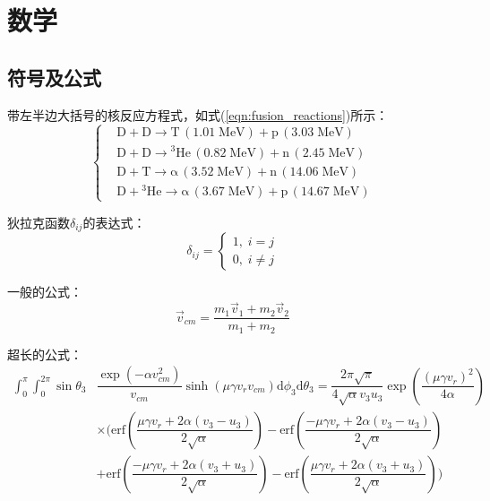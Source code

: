 \chapter{数学}
\label{cha:math}
\section{符号及公式}
\label{sec:formula}
带左半边大括号的核反应方程式，如式(\ref{eqn:fusion_reactions})所示：
\begin{equation}
	\label{eqn:fusion_reactions}
	\left\{
	\begin{aligned}
		&\mbox{D}+\mbox{D}\rightarrow \mbox{T}\,(\text{1.01}\;\mbox{MeV})+\mbox{p}\,(\text{3.03}\;\mbox{MeV}) \\
		&\mbox{D}+\mbox{D}\rightarrow {^{\text{3}}}\mbox{He}\,(\text{0.82}\;\mbox{MeV})+\mbox{n}\,(\text{2.45}\;\mbox{MeV}) \\
		&\mbox{D}+\mbox{T}\rightarrow \text{α}\,(\text{3.52}\;\mbox{MeV})+\mbox{n}\,(\text{14.06}\;\mbox{MeV}) \\
		&\mbox{D}+{^{\text{3}}}\mbox{He}\rightarrow \text{α}\,(\text{3.67}\;\mbox{MeV})+\mbox{p}\,(\text{14.67}\;\mbox{MeV})
	\end{aligned}
	\right.
\end{equation}

狄拉克函数$\delta_{ij}$的表达式：
\begin{equation}
	\label{eqn:delta_ij}
	\delta_{ij}=\left\{
	\begin{aligned}
		1,\; i=j \\
		0,\; i\neq j
	\end{aligned}
	\right.
\end{equation}

一般的公式：
\begin{equation}
	\label{eqn:vec_v_cm}
	\vec{v}_{cm}=\dfrac{m_{1}\vec{v}_{1}+m_{2}\vec{v}_{2}}{m_{1}+m_{2}}
\end{equation}

超长的公式\cite{appelbe2011production}：
\begin{equation}
	\label{eqn:iint_theta3_phi3}
	\begin{split}
		\int_{0}^{\pi}\int_{0}^{2\pi} \sin\theta_{3}&\dfrac{\exp(-\alpha v_{cm}^{2})}{v_{cm}}\sinh(\mu \gamma v_{r}v_{cm})\mbox{d}\phi_{3}\mbox{d}\theta_{3}=\dfrac{2\pi \sqrt{\pi}}{4\sqrt{\alpha}v_{3}u_{3}}\exp\left( \dfrac{(\mu \gamma v_{r})^{2}}{4\alpha} \right) \\
		&\times \Bigg( \mbox{erf}\left( \dfrac{\mu \gamma v_{r}+2\alpha(v_{3}-u_{3})}{2\sqrt{\alpha}} \right)-\mbox{erf}\left( \dfrac{-\mu \gamma v_{r}+2\alpha(v_{3}-u_{3})}{2\sqrt{\alpha}} \right) \\
		&+\mbox{erf}\left( \dfrac{-\mu \gamma v_{r}+2\alpha(v_{3}+u_{3})}{2\sqrt{\alpha}} \right)-\mbox{erf}\left( \dfrac{\mu \gamma v_{r}+2\alpha(v_{3}+u_{3})}{2\sqrt{\alpha}} \right) \Bigg)
	\end{split}
\end{equation}

